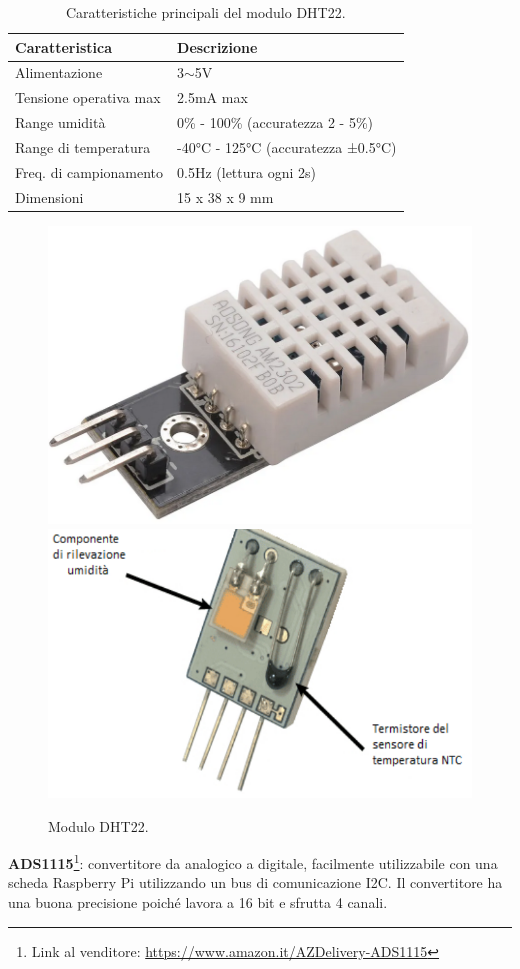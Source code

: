 \begin{table}[H]
    \centering
    \begin{tabular}{|l|l|}
    \hline
    \textbf{Caratteristica} & \textbf{Descrizione}               \\ \hline
    Alimentazione           & 3$\sim$5V                          \\ \hline
    Tensione operativa max  & 2.5mA max                          \\ \hline
    Range umidità           & 0\% - 100\%  (accuratezza 2 - 5\%) \\ \hline
    Range di temperatura    & -40°C - 125°C (accuratezza ±0.5°C) \\ \hline
    Freq. di campionamento  & 0.5Hz (lettura ogni 2s)            \\ \hline
    Dimensioni              & 15 x 38 x 9 mm                     \\ \hline
    \end{tabular}
    \caption{\label{DHT22-features}Caratteristiche principali del modulo DHT22.}
\end{table}

\begin{figure}[H]
    \includegraphics[width=.35\textwidth]{images/sensors/dht22-a.png}\hfill
    \includegraphics[width=.35\textwidth]{images/sensors/dht22-b.png}\hfill
    \caption{Modulo DHT22.}
\end{figure}


\textbf{ADS1115}\footnote{Link al venditore: \href{shorturl.at/btJVZ}{https://www.amazon.it/AZDelivery-ADS1115}}: convertitore da analogico a digitale, facilmente utilizzabile con una scheda Raspberry Pi utilizzando un bus di comunicazione I2C. Il convertitore ha una buona precisione poiché lavora a 16 bit e sfrutta 4 canali.  


